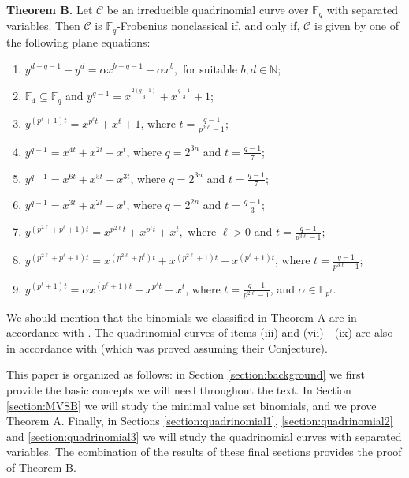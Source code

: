 \documentclass[preprint,12pt]{elsarticle}
\begin{document}
\noindent \textbf{Theorem B.} Let $\mathcal{C}$ be an irreducible quadrinomial curve over $\mathbb{F}_q$ with separated variables. Then $\mathcal{C}$ is $\mathbb{F}_q$-Frobenius nonclassical if, and only if, $\mathcal{C}$ is given by one of the following plane equations:
\begin{enumerate}
    \item[$\mathrm{(i)}$] $y^{d + q - 1} - y^d = \alpha x^{b + q - 1} - \alpha x^b,$ for suitable $b,d\in\mathbb{N}$;
    \item[$\mathrm{(ii)}$] $\mathbb{F}_4 \subseteq \mathbb{F}_q$ and $y^{q - 1} = x^{\frac{2(q - 1)}{3}} + x^{\frac{q - 1}{3}} + 1$;
    \item[$\mathrm{(iii)}$] $y^{(p^{\ell}+1)t} = x^{p^{\ell}t} + x^t + 1$, where $t = \frac{q - 1}{p^{2\ell} - 1}$;
    \item[$\mathrm{(iv)}$] $y^{q-1} = x^{4t} + x^{2t} + x^t$, where $q = 2^{3n}$ and $t = \frac{q - 1}{7}$;
    \item[$\mathrm{(v)}$] $y^{q-1} = x^{6t} +  x^{5t} + x^{3t}$, where $q = 2^{3n}$ and $t = \frac{q - 1}{7}$;
    \item[$\mathrm{(vi)}$] $y^{q-1} = x^{3t} + x^{2t} + x^t$, where $q = 2^{2n}$ and $t = \frac{q - 1}{3}$;
    \item[$\mathrm{(vii)}$] $y^{(p^{2\ell} + p^\ell + 1)t} = x^{p^{2\ell}t} + x^{p^\ell t} + x^t,$ where $\ell > 0$ and $t = \frac{q - 1}{p^{3\ell} - 1}$;
    \item[$\mathrm{(viii)}$] $y^{(p^{2 \ell} + p^\ell + 1)t} = x^{(p^{2 \ell} + p^\ell)t} + x^{(p^{2 \ell} + 1)t} + x^{(p^\ell + 1)t}$, where $t = \frac{q - 1}{p^{3\ell} - 1}$;
    \item[$\mathrm{(ix)}$] $y^{(p^\ell+1)t} = \alpha x^{(p^\ell+1)t} + x^{p^{\ell}t} + x^{t}$, where $t = \frac{q - 1}{p^{2\ell} - 1}$, and $\alpha \in \mathbb{F}_{p^{\ell}}$.
\end{enumerate}

We should mention that the binomials we classified in Theorem A are in accordance with \cite[Conjecture 1.1]{borges-reis}. The quadrinomial curves of items (iii) and (vii) - (ix) are also in accordance with \cite[Theorem 2.8]{borges-reis} (which was proved assuming their Conjecture). 

This paper is organized as follows: in Section \ref{section:background} we first provide the basic concepts we will need throughout the text. In Section \ref{section:MVSB} we will study the minimal value set binomials, and we prove Theorem A. Finally, in Sections \ref{section:quadrinomial1}, \ref{section:quadrinomial2} and \ref{section:quadrinomial3} we will study the quadrinomial curves with separated variables. The combination of the results of these final sections provides the proof of Theorem B.
\end{document}
